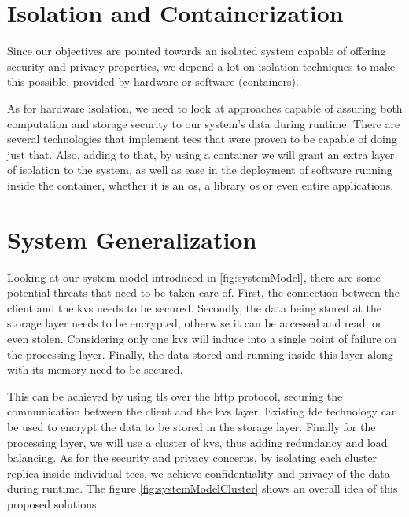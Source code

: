 \section{Isolation and Containerization} %
\label{sec:importing_images}

Since our objectives are pointed towards an isolated system capable of offering security and privacy properties, we depend a lot on isolation techniques to make this possible, provided by hardware or software (containers). 

As for hardware isolation, we need to look at approaches capable of assuring both computation and storage security to our system's data during runtime. There are several technologies that implement \gls{tee}s that were proven to be capable of doing just that.
Also, adding to that, by using a container we will grant an extra layer of isolation to the system, as well as ease in the deployment of software running inside the container, whether it is an \gls{os}, a library \gls{os} or even entire applications.



\section{System Generalization} %

Looking at our system model introduced in \ref{fig:systemModel}, there are some potential threats that need to be taken care of. First, the connection between the client and the \gls{kvs} needs to be secured. Secondly, the data being stored at the storage layer needs to be encrypted, otherwise it can be accessed and read, or even stolen. Considering only one \gls{kvs} will induce into a single point of failure on the processing layer. Finally, the data stored and running inside this layer along with its memory need to be secured. 

This can be achieved by using \gls{tls} over the \gls{http} protocol, securing the communication between the client and the \gls{kvs} layer.  Existing \gls{fde} technology can be used to encrypt the data to be stored in the storage layer. Finally for the processing layer, we will use a cluster of \gls{kvs}, thus adding redundancy and load balancing. As for the security and privacy concerns, by isolating each cluster replica inside individual \gls{tee}s, we achieve confidentiality and privacy of the data during runtime. The figure \ref{fig:systemModelCluster} shows an overall idea of this proposed solutions.

